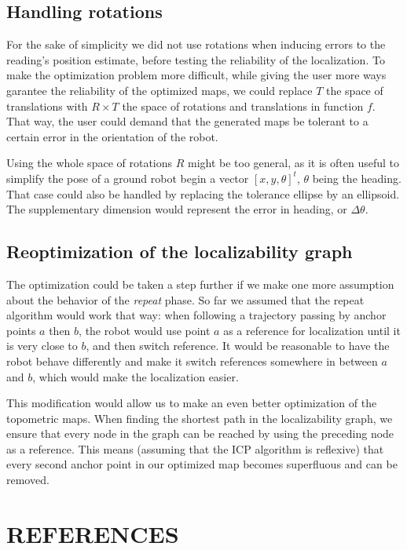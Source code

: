 \documentclass[letterpaper,10 pt,conference]{ieeeconf}
\begin{document}
\subsection{Handling rotations}

For the sake of simplicity we did not use rotations when inducing errors to the reading's
position estimate, before testing the reliability of the localization. To make the optimization
problem more difficult, while giving the user more ways garantee the reliability of the optimized
maps, we could replace $T$ the space of translations with $R \times T$ the space of rotations and
translations in function $f$. That way, the user could demand that the generated maps be tolerant to
a certain error in the orientation of the robot.

Using the whole space of rotations $R$ might be too general, as it is often useful to simplify the pose of a
ground robot begin a vector $[x, y, \theta]^t$, $\theta$ being the heading. That case could also be
handled by replacing the tolerance ellipse by an ellipsoid. The supplementary dimension would
represent the error in heading, or $\Delta \theta$.

\subsection{Reoptimization of the localizability graph}

The optimization could be taken a step further if we make one more assumption about the behavior
of the \textit{repeat} phase. So far we assumed that the repeat algorithm would work that way: when
following a trajectory passing by anchor points $a$ then $b$, the robot would use point $a$ as a
reference for localization until it is very close to $b$, and then switch reference. It would be
reasonable to have the robot behave differently and make it switch references somewhere in between
$a$ and $b$, which would make the localization easier.

This modification would allow us to make an even better optimization of the topometric maps. When
finding the shortest path in the localizability graph, we ensure that every node in the graph can be
reached by using the preceding node as a reference. This means (assuming that the ICP algorithm is
reflexive) that every second anchor point in our optimized map becomes superfluous and can be removed.

\section*{REFERENCES}
\printbibliography
\end{document}
